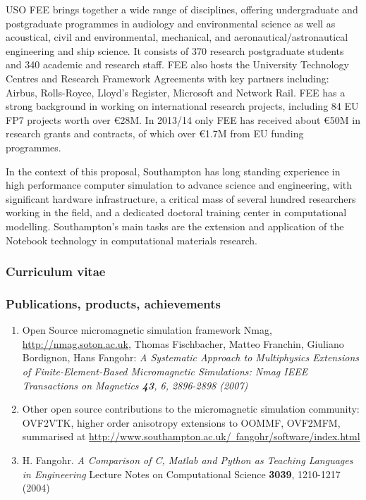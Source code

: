 \begin{sitedescription}{USO}
FEE brings together a wide range of disciplines, offering
undergraduate and postgraduate programmes in audiology and
environmental science as well as acoustical, civil and environmental,
mechanical, and aeronautical/astronautical engineering and ship
science. It consists of 370 research postgraduate students and 340
academic and research staff. FEE also hosts the University Technology
Centres and Research Framework Agreements with key partners including:
Airbus, Rolls-Royce, Lloyd’s Register, Microsoft and Network Rail. FEE
has a strong background in working on international research projects,
including 84 EU FP7 projects worth over \euro 28M.  In 2013/14 only
FEE has received about \euro50M in research grants and contracts, of
which over \euro1.7M from EU funding programmes.

\medskip In the context of this proposal, Southampton has long
standing experience in high performance computer simulation to advance
science and engineering, with significant hardware infrastructure, a
critical mass of several hundred researchers working in the field, and
a dedicated doctoral training center in computational modelling.
Southampton's main tasks are the extension and application of the
\Jupyter{} Notebook technology in computational materials research.

\subsubsection*{Curriculum vitae}





%

\subsubsection*{Publications, products, achievements}

\begin{enumerate}
\item Open Source micromagnetic simulation framework Nmag,
  \href{http://nmag.soton.ac.uk}{http://nmag.soton.ac.uk}, Thomas
  Fischbacher, Matteo Franchin, Giuliano Bordignon, Hans Fangohr: \emph{
A Systematic Approach to Multiphysics Extensions of Finite-Element-Based Micromagnetic Simulations: Nmag 
IEEE Transactions on Magnetics \textbf{43}, 6, 2896-2898 (2007)}
\item Other open source contributions to the micromagnetic simulation
  community: OVF2VTK, higher order anisotropy extensions to OOMMF,
  OVF2MFM, summarised at
  \href{http://www.southampton.ac.uk/~fangohr/software/index.html}{http://www.southampton.ac.uk/~fangohr/software/index.html} 
\item H. Fangohr.
\emph{A Comparison of C, Matlab and Python as Teaching Languages in Engineering}
Lecture Notes on Computational Science \textbf{3039}, 1210-1217 (2004)
\end{enumerate}


\end{sitedescription}

